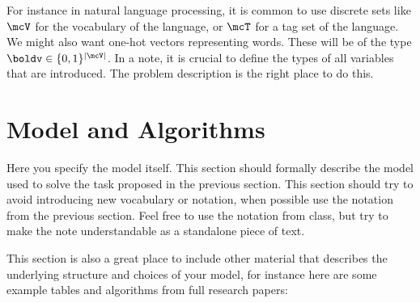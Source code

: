 \documentclass[11pt]{article}
\begin{document}
For instance in natural language processing, it is common to use
discrete sets like $\mcV$ for the vocabulary of the language, or $\mcT$ for a
tag set of the language.  We might also want one-hot vectors
representing words. These will be of the type
$\boldv \in \{0,1\}^{|\mcV|}$. In a note, it is crucial to define the
types of all variables that are introduced. The problem description is the
right place to do this.




\section{Model and Algorithms}

Here you specify the model itself. This section should formally
describe the model used to solve the task proposed in the previous
section. This section should try to avoid introducing new vocabulary
or notation, when possible use the notation from the previous section.
Feel free to use the notation from class, but try to make the note
understandable as a standalone piece of text.

This section is also a great place to include other material that
describes the underlying structure and choices of your model, for
instance here are some example tables and algorithms from full
research papers:
\end{document}
